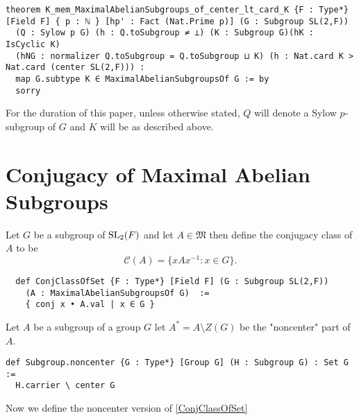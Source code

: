 \begin{footnotesize}
\begin{verbatim}
theorem K_mem_MaximalAbelianSubgroups_of_center_lt_card_K {F : Type*} [Field F] { p : ℕ } [hp' : Fact (Nat.Prime p)] (G : Subgroup SL(2,F))
  (Q : Sylow p G) (h : Q.toSubgroup ≠ ⊥) (K : Subgroup G)(hK : IsCyclic K)
  (hNG : normalizer Q.toSubgroup = Q.toSubgroup ⊔ K) (h : Nat.card K > Nat.card (center SL(2,F))) :
  map G.subtype K ∈ MaximalAbelianSubgroupsOf G := by
  sorry
\end{verbatim}
\end{footnotesize}

For the duration of this paper, unless otherwise stated, $Q$ will denote a Sylow $p$-subgroup of $G$ and $K$ will be as described above. 


\section{Conjugacy of Maximal Abelian Subgroups}

\begin{definition}
  \label{ConjClassOfSet}
  \leanok
  Let $G$ be a subgroup of $\operatorname{SL}_2(F)$ and let $A \in \mathfrak{M}$ then define the conjugacy class of $A$ to be 
  \[
  \mathcal{C}(A) = \{ x A x^{-1} : x \in G \}.
  \]
\end{definition}
\begin{footnotesize}
\begin{verbatim}
  def ConjClassOfSet {F : Type*} [Field F] (G : Subgroup SL(2,F))
    (A : MaximalAbelianSubgroupsOf G)  :=
    { conj x • A.val | x ∈ G }
\end{verbatim}
\end{footnotesize}

\begin{definition}
  \label{Subgroup.noncenter}
  \leanok
  Let $A$ be a subgroup of a group $G$ let $A^* = A \setminus Z(G)$ be the "noncenter" part of $A$.
\end{definition}
\begin{footnotesize}
\begin{verbatim}
def Subgroup.noncenter {G : Type*} [Group G] (H : Subgroup G) : Set G :=
  H.carrier \ center G
\end{verbatim}
\end{footnotesize}

Now we define the noncenter version of \ref{ConjClassOfSet}

